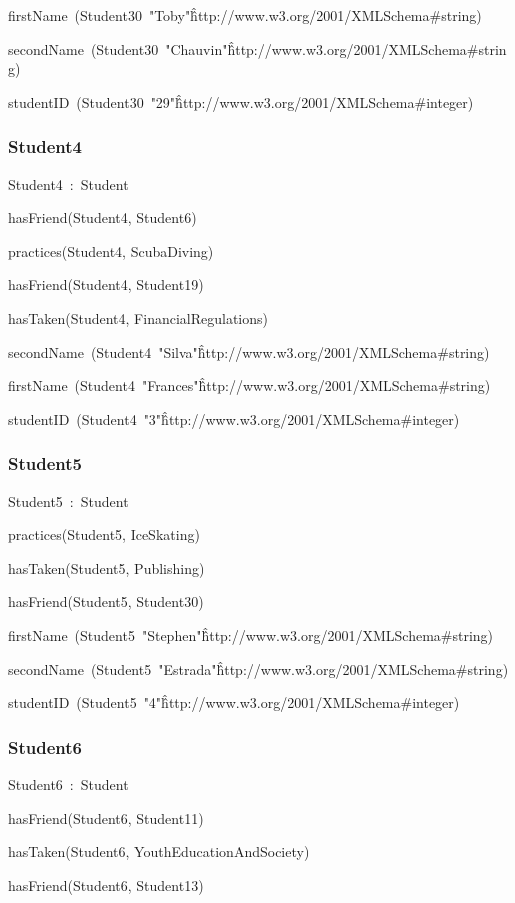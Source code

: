 \documentclass{article}
\begin{document}
firstName~(Student30~"Toby"\^\^http://www.w3.org/2001/XMLSchema#string)

secondName~(Student30~"Chauvin"\^\^http://www.w3.org/2001/XMLSchema#string)

studentID~(Student30~"29"\^\^http://www.w3.org/2001/XMLSchema#integer)

\subsubsection*{Student4}

Student4~:~Student

hasFriend(Student4, Student6)

practices(Student4, ScubaDiving)

hasFriend(Student4, Student19)

hasTaken(Student4, FinancialRegulations)

secondName~(Student4~"Silva"\^\^http://www.w3.org/2001/XMLSchema#string)

firstName~(Student4~"Frances"\^\^http://www.w3.org/2001/XMLSchema#string)

studentID~(Student4~"3"\^\^http://www.w3.org/2001/XMLSchema#integer)

\subsubsection*{Student5}

Student5~:~Student

practices(Student5, IceSkating)

hasTaken(Student5, Publishing)

hasFriend(Student5, Student30)

firstName~(Student5~"Stephen"\^\^http://www.w3.org/2001/XMLSchema#string)

secondName~(Student5~"Estrada"\^\^http://www.w3.org/2001/XMLSchema#string)

studentID~(Student5~"4"\^\^http://www.w3.org/2001/XMLSchema#integer)

\subsubsection*{Student6}

Student6~:~Student

hasFriend(Student6, Student11)

hasTaken(Student6, YouthEducationAndSociety)

hasFriend(Student6, Student13)
\end{document}
